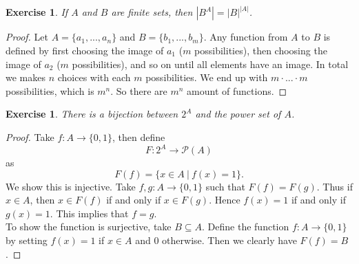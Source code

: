 \documentclass[a4paper, 11pt]{book}
\theoremstyle{plain}
\newtheorem{exercise}[theorem]{Exercise}
\theoremstyle{plain}
\begin{document}
\begin{exercise}
If $A$ and $B$ are finite sets, then $|B^A| = |B|^{|A|}$.
\end{exercise}
\begin{proof}
Let $A=\{a_1,...,a_n\}$ and $B=\{b_1,...,b_m\}$. Any function from $A$ to $B$ is defined by first choosing the image of $a_1$ ($m$ possibilities), then choosing the image of $a_2$ ($m$ possibilities), and so on until all elements have an image. In total we makes $n$ choices with each $m$ possibilities. We end up with $m\cdot ...\cdot m$ possibilities, which is $m^n$. So there are $m^n$ amount of functions.
\end{proof}

\begin{exercise}
There is a bijection between $2^A$ and the power set of $A$.
\end{exercise}
\begin{proof}
Take $f:A\rightarrow \{0,1\}$, then define
$$F:2^A\rightarrow \mathcal{P}(A)$$
as
$$F(f) = \{x\in A~\vert~f(x) = 1\}.$$
We show this is injective. Take $f,g:A\rightarrow \{0,1\}$ such that $F(f) = F(g)$. Thus if $x\in A$, then $x\in F(f)$ if and only if $x\in F(g)$. Hence $f(x)= 1$ if and only if $g(x)=1$. This implies  that $f=g$.\\
To show the function is surjective, take $B\subseteq A$. Define the function $f:A\rightarrow \{0,1\}$ by setting $f(x) = 1$ if $x\in A$ and $0$ otherwise. Then we clearly have $F(f) = B$.
\end{proof}
\end{document}
